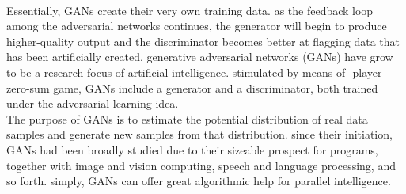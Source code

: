 \documentclass[14pt]{article}
\begin{document}
\\ 
Essentially, GANs create their very own training data. as the feedback loop among the adversarial networks continues, the generator will begin to produce higher-quality output and the discriminator becomes better at flagging data that has been artificially created. 
generative adversarial networks (GANs) have grow to be a research focus of artiﬁcial intelligence. stimulated by means of -player zero-sum game, GANs include a generator and a discriminator, both trained under the adversarial learning idea. 
\\
The purpose of GANs is to estimate the potential distribution of real data samples and generate new samples from that distribution. since their initiation, GANs had been broadly studied due to their sizeable prospect for programs, together with image and vision computing, speech and language processing, and so forth.  simply, GANs can offer great algorithmic help for parallel intelligence. 
\\ 
\end{document}
